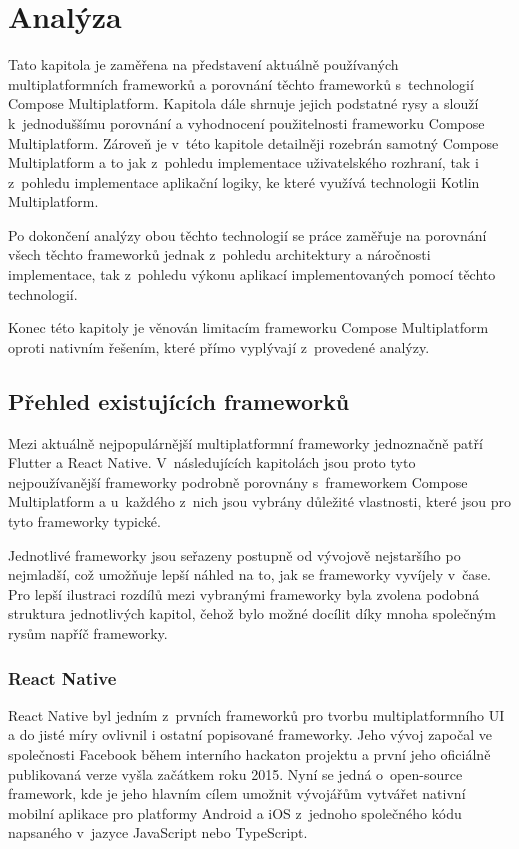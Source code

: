 \chapter{Analýza}
Tato kapitola je zaměřena na představení aktuálně používaných multiplatformních frameworků a porovnání těchto frameworků
s~technologií Compose Multiplatform. Kapitola dále shrnuje jejich podstatné rysy a slouží
k~jednoduššímu porovnání a vyhodnocení použitelnosti frameworku Compose Multiplatform. Zároveň je v~této kapitole detailněji
rozebrán samotný Compose Multiplatform a to jak z~pohledu implementace uživatelského rozhraní, tak i z~pohledu implementace
aplikační logiky, ke které využívá technologii Kotlin Multiplatform.

Po dokončení analýzy obou těchto technologií se práce zaměřuje na porovnání všech těchto frameworků jednak z~pohledu architektury
a náročnosti implementace, tak z~pohledu výkonu aplikací implementovaných pomocí těchto technologií. 

Konec této kapitoly je věnován limitacím frameworku Compose Multiplatform oproti nativním řešením, které přímo vyplývají 
z~provedené analýzy.  


\section{Přehled existujících frameworků}
Mezi aktuálně nejpopulárnější multiplatformní frameworky jednoznačně patří Flutter a React Native. \cite{crossPlatformFrameworksStats}
V~následujících kapitolách jsou proto tyto nejpoužívanější frameworky podrobně porovnány s~frameworkem Compose Multiplatform a u~každého z~nich 
jsou vybrány důležité vlastnosti, které jsou pro tyto frameworky typické. 

Jednotlivé frameworky jsou seřazeny postupně od vývojově nejstaršího
po nejmladší, což umožňuje lepší náhled na to, jak se frameworky vyvíjely v~čase. Pro lepší ilustraci rozdílů 
mezi vybranými frameworky byla zvolena 
podobná struktura jednotlivých kapitol, čehož bylo možné docílit díky mnoha společným rysům napříč frameworky.

\subsection{React Native}
React Native byl jedním z~prvních frameworků pro tvorbu multiplatformního UI a do jisté míry ovlivnil i ostatní popisované
frameworky. Jeho vývoj započal ve společnosti Facebook během interního hackaton projektu a první jeho oficiálně publikovaná
verze vyšla začátkem roku 2015. \cite{reactNativeHistory}
Nyní se jedná o~open-source framework, kde je jeho hlavním cílem umožnit vývojářům vytvářet nativní mobilní aplikace 
pro platformy Android a iOS z~jednoho společného kódu napsaného v~jazyce JavaScript nebo TypeScript.

